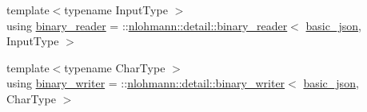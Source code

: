 \begin{DoxyCompactItemize}
\item 
{\footnotesize template$<$typename Input\+Type $>$ }\\using \hyperlink{classnlohmann_1_1basic__json_a6c26be4635e562ebae8b9a142f9538b4}{binary\+\_\+reader} = \+::\hyperlink{classnlohmann_1_1detail_1_1binary__reader}{nlohmann\+::detail\+::binary\+\_\+reader}$<$ \hyperlink{classnlohmann_1_1basic__json}{basic\+\_\+json}, Input\+Type $>$
\item 
{\footnotesize template$<$typename Char\+Type $>$ }\\using \hyperlink{classnlohmann_1_1basic__json_ab483f21649bd170f593ec58044cd68a6}{binary\+\_\+writer} = \+::\hyperlink{classnlohmann_1_1detail_1_1binary__writer}{nlohmann\+::detail\+::binary\+\_\+writer}$<$ \hyperlink{classnlohmann_1_1basic__json}{basic\+\_\+json}, Char\+Type $>$
\end{DoxyCompactItemize}
